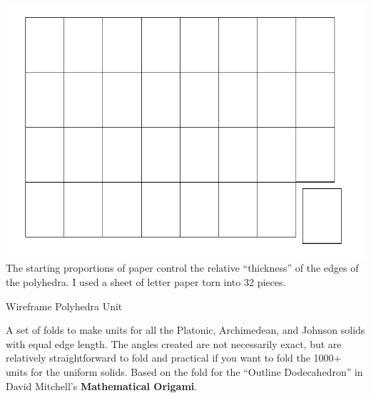 \documentclass[11pt]{article}
\begin{document}
\begin{minipage}[t]{0.3\textwidth}
  \strut\vspace*{-\baselineskip}\newline\includegraphics[width=\textwidth]{../figs/fig0}
  The starting proportions of paper control the relative ``thickness'' of the edges of the polyhedra.  I used a sheet of letter paper torn into 32 pieces.
\end{minipage}
\hspace{0.02\linewidth}
\begin{minipage}[t]{0.6\textwidth}
  {\Huge Wireframe Polyhedra Unit}
  \vspace*{0.25in}
  
  A set of folds to make units for all the Platonic, Archimedean, and Johnson solids with equal edge length.  The angles created are not necessarily exact, but are relatively straightforward to fold and practical if you want to fold the 1000+ units for the uniform solids.  Based on the fold for the ``Outline Dodecahedron'' in David Mitchell's {\bf Mathematical Origami}.
\end{minipage}

\vspace*{0.125in}
\end{document}

